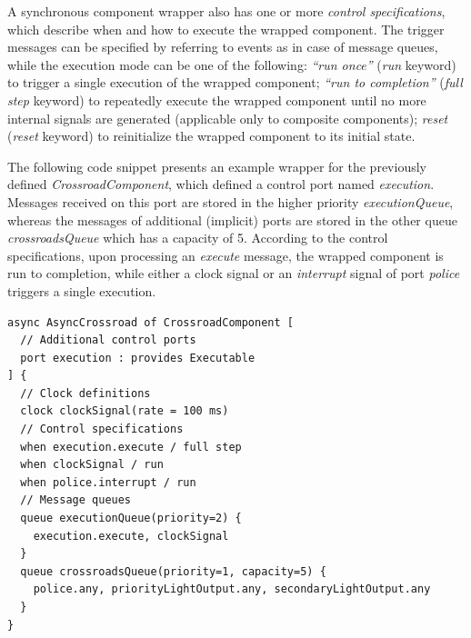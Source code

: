 A synchronous component wrapper also has one or more \emph{control specifications}, which describe when and how to execute the wrapped component. The trigger messages can be specified by referring to events as in case of message queues, while the execution mode can be one of the following: 
\emph{``run once''} (\emph{run} keyword) to trigger a single execution of the wrapped component;
\emph{``run to completion''} (\emph{full step} keyword) to repeatedly execute the wrapped component until no more internal signals are generated (applicable only to composite components);
\emph{reset} (\emph{reset} keyword) to reinitialize the wrapped component to its initial state.


The following code snippet presents an example wrapper for the previously defined \emph{CrossroadComponent}, which defined a control port named \emph{execution}. Messages received on this port are stored in the higher priority \emph{executionQueue}, whereas
the messages of additional (implicit) ports are stored in the other queue \emph{crossroadsQueue} which has a capacity of 5. According to the control specifications, upon processing an \emph{execute} message, the wrapped component is run to completion, while either
a clock signal or an \emph{interrupt} signal of port \emph{police} triggers a single execution.
\begin{lstlisting}
async AsyncCrossroad of CrossroadComponent [
  // Additional control ports
  port execution : provides Executable
] {
  // Clock definitions
  clock clockSignal(rate = 100 ms)
  // Control specifications
  when execution.execute / full step
  when clockSignal / run
  when police.interrupt / run
  // Message queues
  queue executionQueue(priority=2) {
    execution.execute, clockSignal
  }
  queue crossroadsQueue(priority=1, capacity=5) {
    police.any, priorityLightOutput.any, secondaryLightOutput.any
  }
}
\end{lstlisting}
